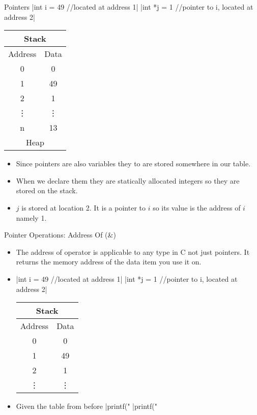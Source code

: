 \documentclass[10pt]{beamer}
\begin{document}
\begin{frame}[fragile]{Pointers}
	|int i = 49 //located at address 1|
	|int *j = 1 //pointer to i, located at address 2|

	\begin{tabular}{|c|c|}
		\hline
		\multicolumn{2}{|c|}{Stack}\\
		\hline
		Address & Data\\
		\hline
		0 &	0\\
		\hline
		1 &	49\\
		\hline
		2 &	1\\
		\hline
		\vdots & \vdots \\
		\hline
		n & 13\\
		\hline
		\multicolumn{2}{|c|}{Heap}\\
		\hline
	\end{tabular}


	\begin{itemize}[<+->]
		\item Since pointers are also variables they to are stored somewhere in our table.
		\item When we declare them they are statically allocated integers so they are stored on the stack.
		\item $j$ is stored at location 2. It is a pointer to $i$ so its value is the address of $i$ namely 1.
	\end{itemize}
\end{frame}



\begin{frame}[fragile]{Pointer Operations: Address Of (\&)}
	\begin{itemize}[<+->]
	\item The address of operator is applicable to any type in C not just pointers. It returns the memory address of the data item you use it on.
	\item 	{}|int i = 49 //located at address 1|
	|int *j = 1 //pointer to i, located at address 2|

	\begin{tabular}{|c|c|}
		\hline
		\multicolumn{2}{|c|}{Stack}\\
		\hline
		Address & Data\\
		\hline
		0 &	0\\
		\hline
		1 &	49\\
		\hline
		2 &	1\\
		\hline
		\vdots & \vdots \\
		\hline
	\end{tabular}
	\item Given the table from before
	|printf("%
	|printf("%
	\end{itemize}
\end{frame}
\end{document}
